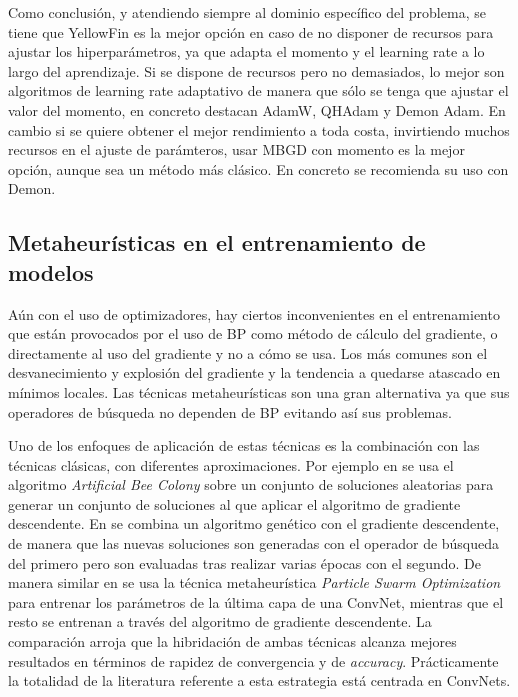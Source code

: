 Como conclusión, y atendiendo siempre al dominio específico del problema, se tiene que YellowFin es la mejor opción en caso de no disponer de recursos para ajustar los hiperparámetros, ya que adapta el momento y el learning rate a lo largo del aprendizaje. Si se dispone de recursos pero no demasiados, lo mejor son algoritmos de learning rate adaptativo de manera que sólo se tenga que ajustar el valor del momento, en concreto destacan AdamW, QHAdam y Demon Adam. En cambio si se quiere obtener el mejor rendimiento a toda costa, invirtiendo muchos recursos en el ajuste de parámteros, usar MBGD con momento es la mejor opción, aunque sea un método más clásico. En concreto se recomienda su uso con Demon.


\subsection{Metaheurísticas en el entrenamiento de modelos}

Aún con el uso de optimizadores, hay ciertos inconvenientes en el entrenamiento que están provocados por el uso de BP como método de cálculo del gradiente, o directamente al uso del gradiente y no a cómo se usa. Los más comunes son el desvanecimiento y explosión del gradiente y la tendencia a quedarse atascado en mínimos locales. Las técnicas metaheurísticas son una gran alternativa ya que sus operadores de búsqueda no dependen de BP evitando así sus problemas. 

Uno de los enfoques de aplicación de estas técnicas es la combinación con las técnicas clásicas, con diferentes aproximaciones. Por ejemplo en \cite{162} se usa el algoritmo \textit{Artificial Bee Colony} \cite{beesalgo} sobre un conjunto de soluciones aleatorias para generar un conjunto de soluciones al que aplicar el algoritmo de gradiente descendente. En \cite{155} se combina un algoritmo genético con el gradiente descendente, de manera que las nuevas soluciones son generadas con el operador de búsqueda del primero pero son evaluadas tras realizar varias épocas con el segundo. De manera similar en \cite{163} se usa la técnica metaheurística \textit{Particle Swarm Optimization} \cite{pso} para entrenar los parámetros de la última capa de una ConvNet, mientras que el resto se entrenan a través del algoritmo de gradiente descendente. La comparación arroja que la hibridación de ambas técnicas alcanza mejores resultados en términos de rapidez de convergencia y de \textit{accuracy}. Prácticamente la totalidad de la literatura referente a esta estrategia está centrada en ConvNets.

